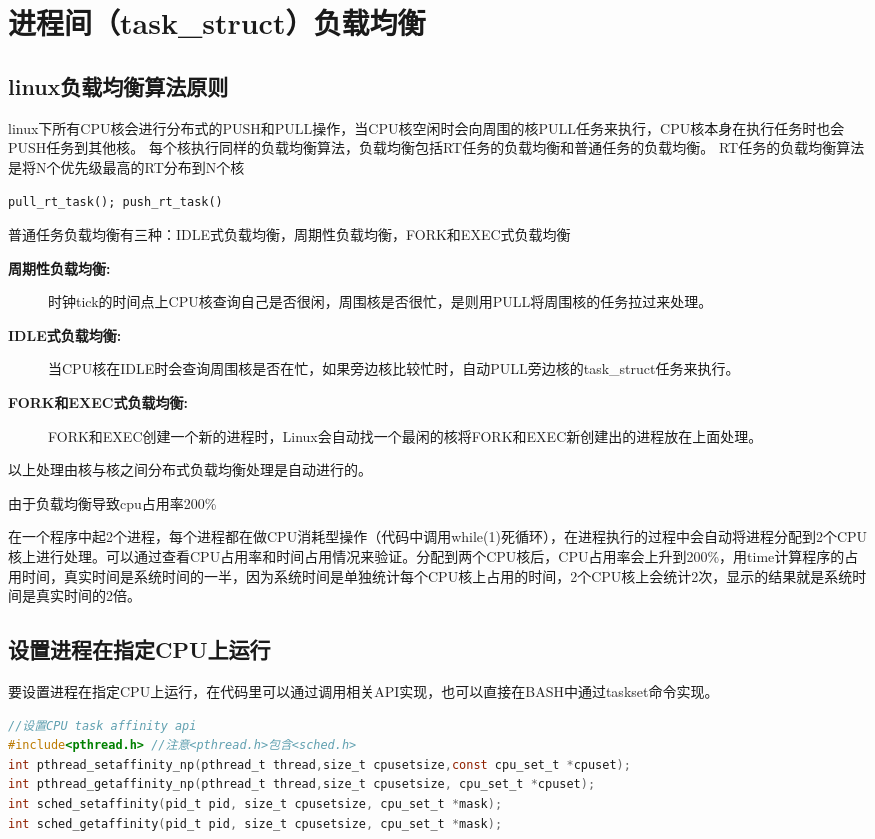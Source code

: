 \section{进程间（task\_struct）负载均衡}
\subsection{linux负载均衡算法原则}
linux下所有CPU核会进行分布式的PUSH和PULL操作，当CPU核空闲时会向周围的核PULL任务来执行，CPU核本身在执行任务时也会PUSH任务到其他核。
每个核执行同样的负载均衡算法，负载均衡包括RT任务的负载均衡和普通任务的负载均衡。
RT任务的负载均衡算法是将N个优先级最高的RT分布到N个核

\verb|pull_rt_task(); push_rt_task()|

普通任务负载均衡有三种：IDLE式负载均衡，周期性负载均衡，FORK和EXEC式负载均衡

\begin{description}
  \item[\textbf{周期性负载均衡:}] 时钟tick的时间点上CPU核查询自己是否很闲，周围核是否很忙，是则用PULL将周围核的任务拉过来处理。
  \item[\textbf{IDLE式负载均衡:}] 当CPU核在IDLE时会查询周围核是否在忙，如果旁边核比较忙时，自动PULL旁边核的task\_struct任务来执行。
  \item[\textbf{FORK和EXEC式负载均衡:}] FORK和EXEC创建一个新的进程时，Linux会自动找一个最闲的核将FORK和EXEC新创建出的进程放在上面处理。
\end{description}
以上处理由核与核之间分布式负载均衡处理是自动进行的。

\begin{example*}
  \wdexpbox
  {\caption{由于负载均衡导致cpu占用率200\%}}
  {在一个程序中起2个进程，每个进程都在做CPU消耗型操作（代码中调用while(1)死循环），在进程执行的过程中会自动将进程分配到2个CPU核上进行处理。可以通过查看CPU占用率和时间占用情况来验证。分配到两个CPU核后，CPU占用率会上升到200\%，用time计算程序的占用时间，真实时间是系统时间的一半，因为系统时间是单独统计每个CPU核上占用的时间，2个CPU核上会统计2次，显示的结果就是系统时间是真实时间的2倍。}
\end{example*}

\subsection{设置进程在指定CPU上运行}
要设置进程在指定CPU上运行，在代码里可以通过调用相关API实现，也可以直接在BASH中通过taskset命令实现。
\begin{lstlisting}[language={C}]
//设置CPU task affinity api
#include<pthread.h> //注意<pthread.h>包含<sched.h>
int pthread_setaffinity_np(pthread_t thread,size_t cpusetsize,const cpu_set_t *cpuset);
int pthread_getaffinity_np(pthread_t thread,size_t cpusetsize, cpu_set_t *cpuset);
int sched_setaffinity(pid_t pid, size_t cpusetsize, cpu_set_t *mask);
int sched_getaffinity(pid_t pid, size_t cpusetsize, cpu_set_t *mask);
\end{lstlisting}

